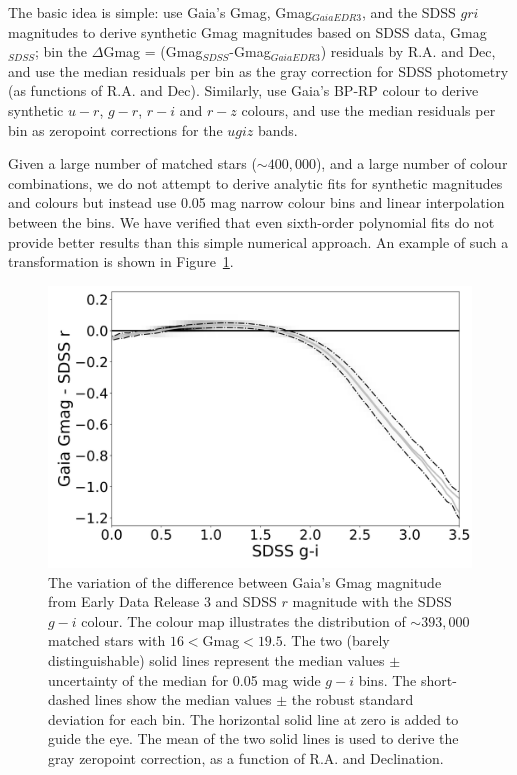 \documentclass[fleqn,usenatbib]{mnras}
\begin{document}
The basic idea is simple: use Gaia's Gmag, Gmag$_{GaiaEDR3}$, and the SDSS $gri$ magnitudes
to derive synthetic Gmag magnitudes based on SDSS data, Gmag$_{SDSS}$; bin the 
$\Delta$Gmag = (Gmag$_{SDSS}$-Gmag$_{GaiaEDR3}$) residuals by R.A. and Dec, and 
use the median residuals per bin as the gray correction for SDSS photometry (as functions
of R.A. and Dec). Similarly, use Gaia's BP-RP colour to derive synthetic $u-r$, $g-r$, $r-i$
and $r-z$ colours, and use the median residuals per bin as zeropoint corrections for 
the $ugiz$ bands. 

Given a large number of matched stars ($\sim 400,000$), and a large number of colour combinations,
we do not attempt to derive analytic fits for synthetic magnitudes and colours but instead
use 0.05 mag narrow colour bins and linear interpolation between the bins. We have verified
that even sixth-order polynomial fits do not provide better results than this simple 
numerical approach. An example of such a transformation is shown in Figure~\ref{fig:GrVSgi}. 


\begin{figure}
  \centering\includegraphics[width=0.95\columnwidth]{figures/GrVSgi.png} 
\caption{The variation of the difference between Gaia's Gmag magnitude from Early Data Release 3
and SDSS $r$ magnitude with the SDSS $g-i$ colour.
The  colour map illustrates the distribution of $\sim 393,000$ matched stars with 
$16<$Gmag$<19.5$. The two (barely distinguishable) solid lines represent the median 
values $\pm$ uncertainty of the median for 0.05 mag wide $g-i$ bins. The short-dashed 
lines show the median values $\pm$ the robust standard deviation for 
each bin. The horizontal solid line at zero is added to guide the eye. The mean of 
the two solid lines is used to derive the gray zeropoint correction, as a function of R.A.
and Declination.}
\label{fig:GrVSgi}
\end{figure}
\end{document}
